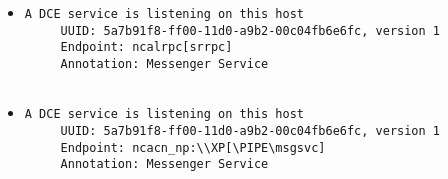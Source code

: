 \documentclass{article}
\begin{document}
\begin{itemize}
\begin{verbatim}
\end{verbatim}\item \begin{verbatim}
A DCE service is listening on this host
     UUID: 5a7b91f8-ff00-11d0-a9b2-00c04fb6e6fc, version 1
     Endpoint: ncalrpc[srrpc]
     Annotation: Messenger Service


\end{verbatim}\item \begin{verbatim}
A DCE service is listening on this host
     UUID: 5a7b91f8-ff00-11d0-a9b2-00c04fb6e6fc, version 1
     Endpoint: ncacn_np:\\XP[\PIPE\msgsvc]
     Annotation: Messenger Service


\end{verbatim}\end{itemize}
\end{document}

